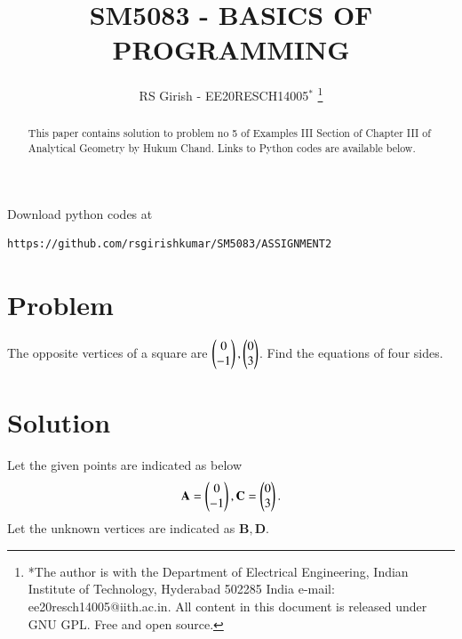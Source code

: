 \documentclass[journal,12pt,twocolumn]{IEEEtran}
\begin{document}
\makeatletter
{}
\makeatother
\let\StandardTheFigure\thefigure
\let\vec\mathbf
\renewcommand{\thefigure}{\theproblem}
\def\putbox#1#2#3{\makebox[0in][l]{\makebox[#1][l]{}\raisebox{\baselineskip}[0in][0in]{\raisebox{#2}[0in][0in]{#3}}}}
     \def\rightbox#1{\makebox[0in][r]{#1}}
     \def\centbox#1{\makebox[0in]{#1}}
     \def\topbox#1{\raisebox{-\baselineskip}[0in][0in]{#1}}
     \def\midbox#1{\raisebox{-0.5\baselineskip}[0in][0in]{#1}}
\vspace{3cm}
\title{
SM5083 - BASICS OF PROGRAMMING
	}
\author{ RS Girish - EE20RESCH14005$^{*}$%
\thanks{*The author is with the Department
		of Electrical Engineering, Indian Institute of Technology, Hyderabad
		502285 India e-mail:  ee20resch14005@iith.ac.in. All content in this document is released under GNU GPL.  Free and open source.}
	}
\maketitle
\newpage
\tableofcontents
\bigskip
\renewcommand{\thefigure}{\theenumi}
\renewcommand{\thetable}{\theenumi}
\begin{abstract}
This paper contains solution to problem no 5 of Examples III Section of Chapter III of Analytical Geometry by Hukum Chand.
Links to Python codes are available below.  
\end{abstract}
Download python codes at 
\begin{lstlisting}
https://github.com/rsgirishkumar/SM5083/ASSIGNMENT2
\end{lstlisting}
\section{Problem}
The opposite vertices of a square are $\begin{pmatrix}0\\-1\end{pmatrix},\begin{pmatrix}0\\3\end{pmatrix}$. Find the equations of four sides.
\section{Solution}
Let the given points are indicated as below\\
\begin{align}
\begin{split}
\vec{A} = \myvec{0 \\ -1}, 
\vec{C} = \myvec{0 \\ 3}.\\
\end{split}
\end{align}
Let the unknown vertices are indicated as $ \vec{B},\vec{D}$. 
\end{document}
